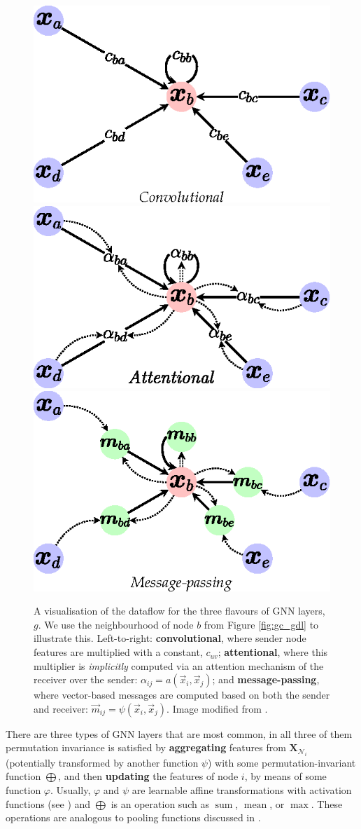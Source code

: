 \begin{figure}
    \centering
    \includegraphics[width=0.33\linewidth]{chapters/assets/graph-figs/GNN_GDL_TYPES_C.eps}
    \hspace{-0.5em}
    \includegraphics[width=0.33\linewidth]{chapters/assets/graph-figs/GNN_GDL_TYPES_A.eps}
    \hspace{-0.5em}
    \includegraphics[width=0.33\linewidth]{chapters/assets/graph-figs/GNN_GDL_TYPES_MP.eps}
    \caption{A visualisation of the dataflow for the three flavours of GNN layers, $g$. We use the neighbourhood of node $b$ from Figure \ref{fig:gc_gdl} to illustrate this. Left-to-right: \textbf{convolutional}, where sender node features are multiplied with a constant, $c_{uv}$; \textbf{attentional}, where this multiplier is \emph{implicitly} computed via an attention mechanism of the receiver over the sender: $\alpha_{ij}=a(\vec{x}_i, \vec{x}_j)$; and \textbf{message-passing}, where vector-based messages are computed based on both the sender and receiver: $\vec{m}_{ij}=\psi(\vec{x}_i, \vec{x}_j)$. Image modified from \parencite{Bronstein2021}.}
    \label{fig:gc_flavours}
\end{figure}%

There are three types of GNN layers that are most common, in all three of them permutation invariance is satisfied by \textbf{aggregating} features from $\symbf{X}_{\mathcal{N}_i}$ (potentially transformed by another function $\psi$) with some permutation-invariant function $\bigoplus$, and then \textbf{updating} the features of node $i$, by means of some function $\varphi$. Usually, $\varphi$ and $\psi$ are learnable affine transformations with activation functions (see ) and $\bigoplus$ is an operation such as $\operatorname{sum}$, $\operatorname{mean}$, or $\operatorname{max}$. These operations are analogous to pooling functions discussed in .

